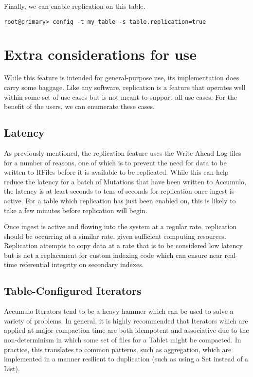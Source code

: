 Finally, we can enable replication on this table.

\begingroup\fontsize{8pt}{8pt}\selectfont\begin{verbatim}
root@primary> config -t my_table -s table.replication=true
\end{verbatim}\endgroup

\section{Extra considerations for use}

While this feature is intended for general-purpose use, its implementation does carry some baggage. Like any software,
replication is a feature that operates well within some set of use cases but is not meant to support all use cases.
For the benefit of the users, we can enumerate these cases.

\subsection{Latency}

As previously mentioned, the replication feature uses the Write-Ahead Log files for a number of reasons, one of which
is to prevent the need for data to be written to RFiles before it is available to be replicated. While this can help
reduce the latency for a batch of Mutations that have been written to Accumulo, the latency is at least seconds to tens
of seconds for replication once ingest is active. For a table which replication has just been enabled on, this is likely
to take a few minutes before replication will begin.

Once ingest is active and flowing into the system at a regular rate, replication should be occurring at a similar rate, 
given sufficient computing resources. Replication attempts to copy data at a rate that is to be considered low latency
but is not a replacement for custom indexing code which can ensure near real-time referential integrity on secondary indexes.

\subsection{Table-Configured Iterators}

Accumulo Iterators tend to be a heavy hammer which can be used to solve a variety of problems. In general, it is highly
recommended that Iterators which are applied at major compaction time are both idempotent and associative due to the
non-determinism in which some set of files for a Tablet might be compacted. In practice, this translates to common patterns,
such as aggregation, which are implemented in a manner resilient to duplication (such as using a Set instead of a List).


